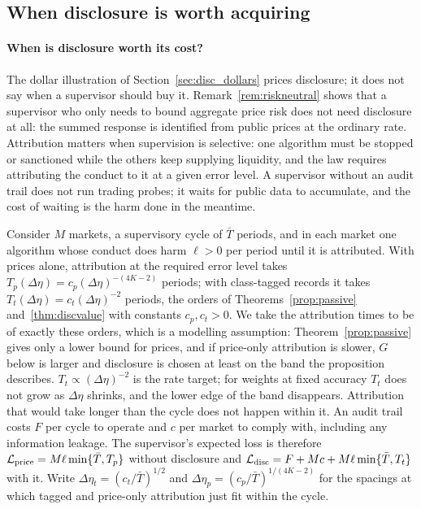\documentclass[12pt]{article}
\theoremstyle{definition}
\theoremstyle{remark}
\begin{document}
\subsection{When disclosure is worth acquiring}\label{sec:decision}

\paragraph{When is disclosure worth its cost?} The dollar illustration of Section~\ref{sec:disc_dollars} prices disclosure; it does not say when a supervisor should buy it. Remark~\ref{rem:riskneutral} shows that a supervisor who only needs to bound aggregate price risk does not need disclosure at all: the summed response is identified from public prices at the ordinary rate. Attribution matters when supervision is selective: one algorithm must be stopped or sanctioned while the others keep supplying liquidity, and the law requires attributing the conduct to it at a given error level. A supervisor without an audit trail does not run trading probes; it waits for public data to accumulate, and the cost of waiting is the harm done in the meantime.

Consider $M$ markets, a supervisory cycle of $\bar T$ periods, and in each market one algorithm whose conduct does harm $\ell>0$ per period until it is attributed. With prices alone, attribution at the required error level takes $T_p(\Delta\eta)=c_p(\Delta\eta)^{-(4K-2)}$ periods; with class-tagged records it takes $T_t(\Delta\eta)=c_t(\Delta\eta)^{-2}$ periods, the orders of Theorems~\ref{prop:passive} and~\ref{thm:discvalue} with constants $c_p,c_t>0$. We take the attribution times to be of exactly these orders, which is a modelling assumption: Theorem~\ref{prop:passive} gives only a lower bound for prices, and if price-only attribution is slower, $G$ below is larger and disclosure is chosen at least on the band the proposition describes. $T_t\propto(\Delta\eta)^{-2}$ is the rate target; for weights at fixed accuracy $T_t$ does not grow as $\Delta\eta$ shrinks, and the lower edge of the band disappears. Attribution that would take longer than the cycle does not happen within it. An audit trail costs $F$ per cycle to operate and $c$ per market to comply with, including any information leakage. The supervisor's expected loss is therefore $\mathcal L_{\rm price}=M\ell\min\{\bar T,T_p\}$ without disclosure and $\mathcal L_{\rm disc}=F+Mc+M\ell\min\{\bar T,T_t\}$ with it. Write $\Delta\eta_t=(c_t/\bar T)^{1/2}$ and $\Delta\eta_p=(c_p/\bar T)^{1/(4K-2)}$ for the spacings at which tagged and price-only attribution just fit within the cycle.
\end{document}
